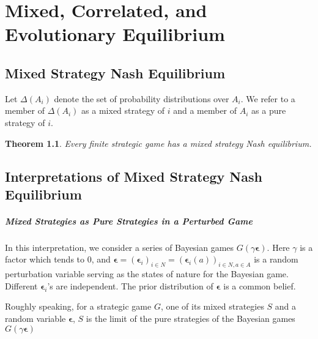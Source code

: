 \documentclass[openany]{book}
\newtheorem{theorem}{Theorem}[chapter]
\begin{document}
\chapter{Mixed, Correlated, and Evolutionary Equilibrium}
\section{Mixed Strategy Nash Equilibrium}
Let $\Delta(A_i)$ denote the set of probability distributions over $A_i$. We refer to a member of $\Delta(A_i)$ as a mixed strategy of $i$ and a member of $A_i$ as a pure strategy of $i$.

\begin{theorem}
Every finite strategic game has a mixed strategy Nash equilibrium.
\end{theorem}

\section{Interpretations of Mixed Strategy Nash Equilibrium}
\paragraph{Mixed Strategies as Pure Strategies in a Perturbed Game}
In this interpretation, we consider a series of Bayesian games $G(\gamma\boldsymbol{\epsilon})$. Here $\gamma$ is a factor which tends to $0$, and $\boldsymbol{\epsilon}=(\boldsymbol{\epsilon}_i)_{i\in N}=(\boldsymbol{\epsilon}_i(a))_{i\in N,a\in A}$ is a random perturbation variable serving as the states of nature for the Bayesian game. Different $\boldsymbol{\epsilon}_i$'s are independent. The prior distribution of $\boldsymbol{\epsilon}$ is a common belief.

Roughly speaking, for a strategic game $G$, one of its mixed strategies $S$ and a random variable $\boldsymbol{\epsilon}$, $S$ is the limit of the pure strategies of the Bayesian games $G(\gamma\boldsymbol{\epsilon})$
\end{document}
